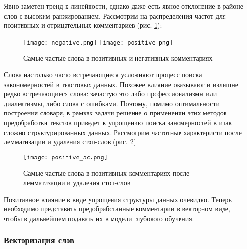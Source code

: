 \bigskip\par
Явно заметен тренд к линейности, однако даже есть явное отклонение в районе слов с высоким ранжированием. Рассмотрим на распределения частот для позитивных и отрицательных комментариев (рис. \ref{fig:distribution_tokens_before_lemmatization}):
\begin{figure}[H]
    \centering
    \texttt{[image: negative.png]}
    \texttt{[image: positive.png]}
    \caption{Самые частые слова в позитивных и негативных комментариях}
    \label{fig:distribution_tokens_before_lemmatization}
\end{figure}

\bigskip\par
Слова настолько часто встречающиеся усложняют процесс поиска закономерностей в текстовых данных. Похожее влияние оказывают и излишне редко встречающиеся слова: зачастую это либо профессионализмы или диалектизмы, либо слова с ошибками. Поэтому, помимо оптимальности построения словаря, в рамках задачи решение о применении этих методов предобработки текстов приведет к упрощению поиска заномерностей в итак сложно структурированных данных. Рассмотрим частотные характеристи после лемматизации и удаления стоп-слов (рис. \ref{fig:distribution_tokens_after_lemmatization})
\begin{figure}[H]
    \centering
    \texttt{[image: positive\_ac.png]}
    \caption{Самые частые слова в позитивных комментариях после лемматизации и удаления стоп-слов}
    \label{fig:distribution_tokens_after_lemmatization}
\end{figure}

\bigskip\par
Позитивное влияние в виде упрощения структуры данных очевидно. Теперь необходимо представить предобработанные комментарии в векторном виде, чтобы в дальнейшем подавать их в модели глубокого обучения.

\subsubsection{Векторизация слов}
